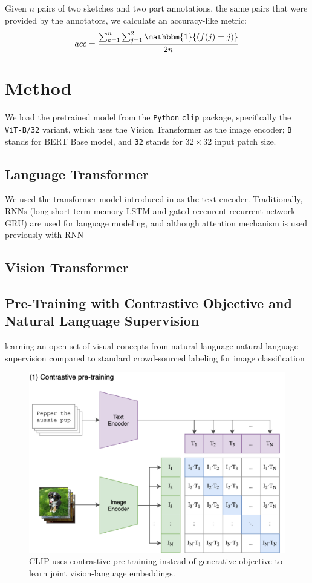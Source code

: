 Given $n$ pairs of two sketches and two part annotations, the same pairs that were provided by the annotators, we calculate an accuracy-like metric:
$$ acc = \frac{\sum_{k=1}^{n} \sum_{j=1}^2 \mathbbm{1}{(f(j) = j)}}{2n} $$

\section{Method}

We load the pretrained model from the \texttt{Python} \texttt{clip} package, specifically the \texttt{ViT-B/32} variant, which uses the Vision Transformer \citep{visiontransformer} as the image encoder; \texttt{B} stands for BERT Base model, and \texttt{32} stands for $32 \times 32$ input patch size. 

\subsection{Language Transformer}
We used the transformer model introduced in \cite{textTransformer} as the text encoder. Traditionally, RNNs (long short-term memory LSTM and gated reccurent recurrent network GRU) are used for language modeling, and although attention mechanism is used previously with RNN     

\subsection{Vision Transformer}


\subsection{Pre-Training with Contrastive Objective and Natural Language Supervision}
learning an open set of visual concepts from natural language
natural language supervision compared to standard crowd-sourced labeling for image classification

\begin{figure}[!htb]
\includegraphics[width=0.7\linewidth]{modeling/CLIP.png}  
\caption{CLIP uses contrastive pre-training instead of generative objective to learn joint vision-language embeddings.}
\label{modeling.clip.pretrainingobj}
\end{figure}

